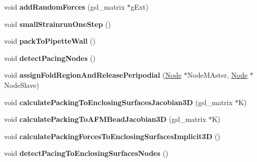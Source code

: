 \begin{DoxyCompactItemize}
\item 
\hypertarget{classSimulation_ad14662c0f9cee95a76c523130e8e688d}{}void {\bfseries add\+Random\+Forces} (gsl\+\_\+matrix $\ast$g\+Ext)\label{classSimulation_ad14662c0f9cee95a76c523130e8e688d}

\item 
\hypertarget{classSimulation_a977de0c85607b9c8e4422ca90776e72a}{}void {\bfseries small\+Strainrun\+One\+Step} ()\label{classSimulation_a977de0c85607b9c8e4422ca90776e72a}

\item 
\hypertarget{classSimulation_a5400ce12848ff3886d56437519728382}{}void {\bfseries pack\+To\+Pipette\+Wall} ()\label{classSimulation_a5400ce12848ff3886d56437519728382}

\item 
\hypertarget{classSimulation_ab67230d22a5c07292574d10d5ee8fc13}{}void {\bfseries detect\+Pacing\+Nodes} ()\label{classSimulation_ab67230d22a5c07292574d10d5ee8fc13}

\item 
\hypertarget{classSimulation_a5a12ff087efbc813a949e347da7a0438}{}void {\bfseries assign\+Fold\+Region\+And\+Release\+Peripodial} (\hyperlink{classNode}{Node} $\ast$Node\+M\+Aster, \hyperlink{classNode}{Node} $\ast$Node\+Slave)\label{classSimulation_a5a12ff087efbc813a949e347da7a0438}

\item 
\hypertarget{classSimulation_a4b259e3827b74767c8005b2126191609}{}void {\bfseries calculate\+Packing\+To\+Enclosing\+Surfaces\+Jacobian3\+D} (gsl\+\_\+matrix $\ast$K)\label{classSimulation_a4b259e3827b74767c8005b2126191609}

\item 
\hypertarget{classSimulation_abc750480132f54e8b02f24d771863de2}{}void {\bfseries calculate\+Packing\+To\+A\+F\+M\+Bead\+Jacobian3\+D} (gsl\+\_\+matrix $\ast$K)\label{classSimulation_abc750480132f54e8b02f24d771863de2}

\item 
\hypertarget{classSimulation_a3b2d417e1f2814ffd8e34c186508c2f2}{}void {\bfseries calculate\+Packing\+Forces\+To\+Enclosing\+Surfaces\+Implicit3\+D} ()\label{classSimulation_a3b2d417e1f2814ffd8e34c186508c2f2}

\item 
\hypertarget{classSimulation_ac1225a76f3acef7e6ecc175d386b6b86}{}void {\bfseries detect\+Pacing\+To\+Enclosing\+Surfaces\+Nodes} ()\label{classSimulation_ac1225a76f3acef7e6ecc175d386b6b86}


\end{DoxyCompactItemize}

